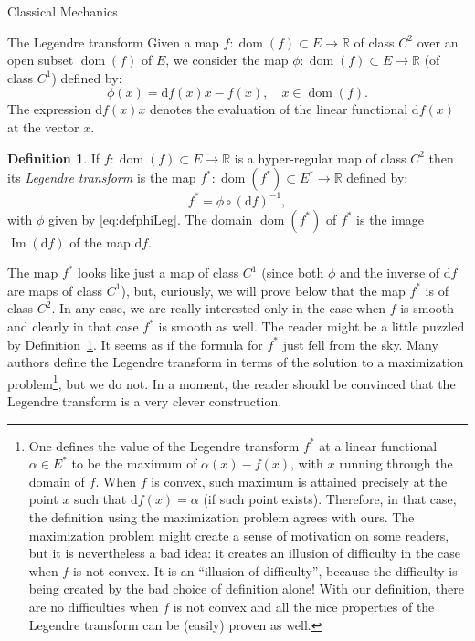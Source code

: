 \documentclass[oneside,a4paper,11pt]{amsbook}
\newcommand{\R}{\mathds R}
\newcommand{\dd}{\mathrm d}
\DeclareMathOperator{\Img}{Im}
\DeclareMathOperator{\Dom}{dom}
\theoremstyle{remark}\newtheorem{exercise}{Exercise}[chapter]
\theoremstyle{plain}\newtheorem{teo}{Theorem}[section]
\theoremstyle{plain}\newtheorem{lem}[teo]{Lemma}
\theoremstyle{plain}\newtheorem{prop}[teo]{Proposition}
\theoremstyle{plain}\newtheorem{cor}[teo]{Corollary}
\theoremstyle{definition}\newtheorem{defin}[teo]{Definition}
\theoremstyle{remark}\newtheorem{rem}[teo]{Remark}
\theoremstyle{definition}\newtheorem{notation}[teo]{Notation}
\theoremstyle{definition}\newtheorem{convention}[teo]{Convention}
\theoremstyle{definition}\newtheorem{example}[teo]{Example}
\numberwithin{section}{chapter}
\numberwithin{equation}{section}
\begin{document}
\begin{chapter}{Classical Mechanics}
\begin{section}{The Legendre transform}
Given a map $f:\Dom(f)\subset E\to\R$ of class $C^2$ over an open subset $\Dom(f)$ of $E$, we consider the map $\phi:\Dom(f)\subset E\to\R$
(of class $C^1$) defined by:
\begin{equation}\label{eq:defphiLeg}
\phi(x)=\dd f(x)x-f(x),\quad x\in\Dom(f).
\end{equation}
The expression $\dd f(x)x$ denotes the evaluation of the linear functional $\dd f(x)$ at the vector $x$.
\begin{defin}\label{thm:defLegendre}
If $f:\Dom(f)\subset E\to\R$ is a hyper-regular map of class $C^2$ then its {\em Legendre transform\/} is the map
$f^*:\Dom(f^*)\subset E^*\to\R$ defined by:
\[f^*=\phi\circ(\dd f)^{-1},\]
with $\phi$ given by \eqref{eq:defphiLeg}.
The domain $\Dom(f^*)$ of $f^*$ is the image $\Img(\dd f)$ of the map $\dd f$.
\end{defin}
The map $f^*$ looks like just a map of class $C^1$ (since both $\phi$ and the inverse of $\dd f$ are maps of class $C^1$), but, curiously,
we will prove below that the map $f^*$ is of class $C^2$. In any case, we are really interested only in the case when $f$ is smooth and clearly in that case
$f^*$ is smooth as well. The reader might be a little puzzled by Definition~\ref{thm:defLegendre}.
It seems as if the formula for $f^*$ just fell from the sky.
Many authors define the Legendre transform in terms of the solution to a maximization problem\footnote{%
One defines the value of the Legendre transform $f^*$ at a linear functional $\alpha\in E^*$ to be the maximum of
$\alpha(x)-f(x)$, with $x$ running through the domain of $f$. When $f$ is convex, such maximum is attained precisely at the
point $x$ such that $\dd f(x)=\alpha$ (if such point exists). Therefore, in that case, the definition using the maximization problem agrees with ours.
The maximization problem might create a sense of motivation on some readers, but it is nevertheless a bad idea: it creates an illusion of difficulty in the
case when $f$ is not convex. It is an ``illusion of difficulty'', because the difficulty is being created by the bad choice of definition alone! With our definition,
there are no difficulties when $f$ is not convex and all the nice properties of the Legendre transform can be (easily) proven as well.}, but we do not.
In a moment, the reader should be convinced that the Legendre transform is a very clever construction.


\end{section}
\end{chapter}
\end{document}
